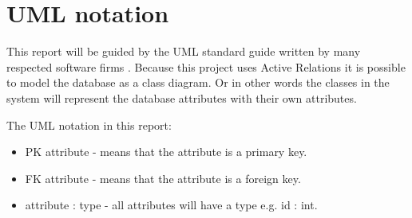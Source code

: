 \section{UML notation}

This report will be guided by the UML standard guide written by many respected software firms \citep{UML_notation}.
Because this project uses Active Relations it is possible to model the database as a class diagram. Or in other words the classes in the system will represent the database attributes with their own attributes.

The UML notation in this report:
\begin{itemize}
	\item PK attribute - means that the attribute is a primary key.
	\item FK attribute - means that the attribute is a foreign key.
	\item attribute : type - all attributes will have a type e.g. id : int.
\end{itemize}

